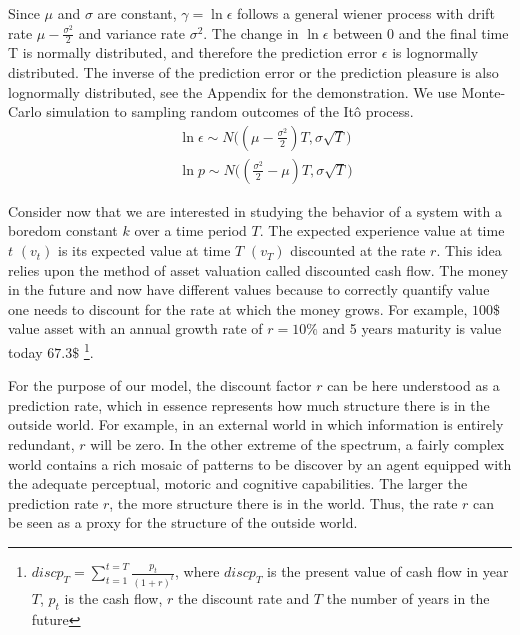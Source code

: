 \documentclass[11pt, onecolumn]{article}
\begin{document}
Since $\mu$ and $\sigma$ are constant, $\gamma = \ln \epsilon$ follows a general wiener process with drift rate $\mu - \frac{\sigma^2}{2}$ and variance rate $\sigma^2$. The change in $ \ln \epsilon$ between 0 and the final time T is normally distributed, and therefore the prediction error $\epsilon$ is lognormally distributed. The inverse of the prediction error or the prediction pleasure is also lognormally distributed, see the Appendix for the demonstration. We use Monte-Carlo simulation to sampling random outcomes of the It\^{o} process.
\begin{equation}
\begin{split}
& \ln \epsilon \sim N \bigg((\mu -\frac{\sigma^2}{2})T, \sigma \sqrt{T}\bigg) \\
& \ln p \sim N\bigg( (\frac{\sigma^2}{2} - \mu)T, \sigma \sqrt{T} \bigg)
\end{split}
\label{eq:lgnp}
\end{equation}


Consider now that we are interested in studying the behavior of a system with a boredom constant $k$ over a time period $T$. The expected experience value at time $t$ $(v_t)$ is its expected value at time $T$ $(v_T)$ discounted at the rate $r$. This idea relies upon the method of asset valuation called discounted cash flow. The money in the future and now have different values because to correctly quantify  value one needs to discount for the rate at which the money grows. 
For example, $100\$$ value asset with an annual growth rate of $r=10\%$ and 5 years maturity is value today $67.3\$$ \footnote{$discp_T = \sum_{t=1}^{t=T}\frac{p_t}{(1 + r)^t}$, where $discp_T$ is the present value of cash flow in year $T$, $p_t$ is the cash flow, $r$ the discount rate and $T$ the number of years in the future}. 

For the purpose of our model, the discount factor $r$ can be here understood as a prediction rate, which in essence represents how much structure there is in the outside world. For example, in an external world in which information is entirely redundant, $r$ will be zero.
In the other extreme of the spectrum, a fairly complex world contains a rich mosaic of patterns to be discover by an agent equipped with the adequate perceptual, motoric and cognitive capabilities. The larger the prediction rate $r$, the more structure there is in the world. Thus, the rate $r$ can be seen as a proxy for the structure of the outside world. 
\end{document}
